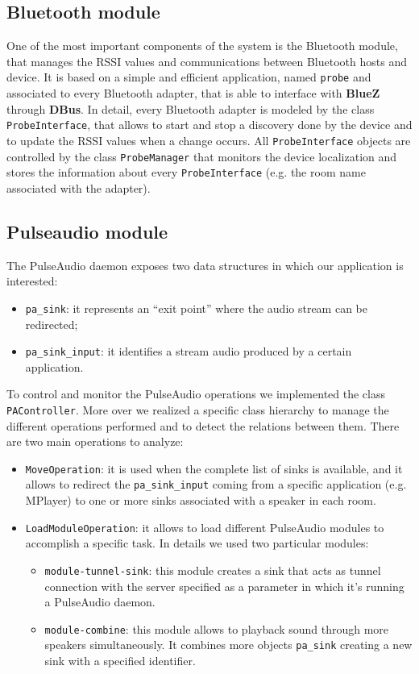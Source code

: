 \documentclass[conference]{IEEEtran}
\begin{document}
\subsection{Bluetooth module}
One of the most important components of the system is the Bluetooth module, that manages the RSSI values and communications between Bluetooth hosts and device. It is based on a simple and efficient application, named \texttt{probe} and associated to every Bluetooth adapter, that is able to interface with \textbf{BlueZ} through \textbf{DBus}. In detail, every Bluetooth adapter is modeled by the class \texttt{ProbeInterface}, that allows to start and stop a discovery done by the device and to update the RSSI values when a change occurs. All \texttt{ProbeInterface} objects are controlled by the class \texttt{ProbeManager} that monitors the device localization and stores the information about every \texttt{ProbeInterface} (e.g. the room name associated with the adapter).

\subsection{Pulseaudio module}
The PulseAudio daemon exposes two data structures in which our application is interested:
\begin{itemize}
\item \texttt{pa\_sink}: it represents an ``exit point'' where the audio stream can be redirected;
\item \texttt{pa\_sink\_input}: it identifies a stream audio produced by a certain application.
\end{itemize}

To control and monitor the PulseAudio operations we implemented the class \texttt{PAController}. More over we realized a specific class hierarchy to manage the different operations performed and to detect the relations between them. There are two main operations to analyze:
\begin{itemize}
\item \texttt{MoveOperation}: it is used when the complete list of sinks is available, and it allows to redirect the \texttt{pa\_sink\_input} coming from a specific application (e.g. MPlayer) to one or more sinks associated with a speaker in each room.
\item \texttt{LoadModuleOperation}: it allows to load different PulseAudio modules to accomplish a specific task. In details we used two particular modules:
	\begin{itemize}
	\item \texttt{module-tunnel-sink}: this module creates a sink that acts as tunnel connection with the server specified as a parameter in which it's running a PulseAudio daemon.
	\item \texttt{module-combine}: this module allows to playback sound through more speakers simultaneously. It combines more objects \texttt{pa\_sink} creating a new sink with a specified identifier.
	\end{itemize}
\end{itemize}
\end{document}
